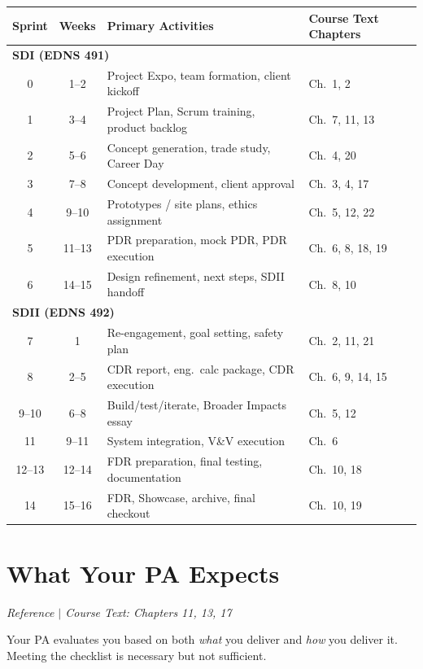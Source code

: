 \documentclass[11pt,letterpaper]{article}
\begin{document}
\begin{center}\small
\begin{longtable}{c c p{5.5cm} p{3.5cm}}
\toprule
\textbf{Sprint} & \textbf{Weeks} & \textbf{Primary Activities} & \textbf{Course Text Chapters} \\
\midrule
\endhead
\multicolumn{4}{l}{\textbf{SDI (EDNS 491)}} \\
\midrule
0 & 1--2 & Project Expo, team formation, client kickoff & Ch.~1, 2 \\
1 & 3--4 & Project Plan, Scrum training, product backlog & Ch.~7, 11, 13 \\
2 & 5--6 & Concept generation, trade study, Career Day & Ch.~4, 20 \\
3 & 7--8 & Concept development, client approval & Ch.~3, 4, 17 \\
4 & 9--10 & Prototypes / site plans, ethics assignment & Ch.~5, 12, 22 \\
5 & 11--13 & PDR preparation, mock PDR, PDR execution & Ch.~6, 8, 18, 19 \\
6 & 14--15 & Design refinement, next steps, SDII handoff & Ch.~8, 10 \\
\midrule
\multicolumn{4}{l}{\textbf{SDII (EDNS 492)}} \\
\midrule
7 & 1 & Re-engagement, goal setting, safety plan & Ch.~2, 11, 21 \\
8 & 2--5 & CDR report, eng.\ calc package, CDR execution & Ch.~6, 9, 14, 15 \\
9--10 & 6--8 & Build/test/iterate, Broader Impacts essay & Ch.~5, 12 \\
11 & 9--11 & System integration, V\&V execution & Ch.~6 \\
12--13 & 12--14 & FDR preparation, final testing, documentation & Ch.~10, 18 \\
14 & 15--16 & FDR, Showcase, archive, final checkout & Ch.~10, 19 \\
\bottomrule
\end{longtable}
\end{center}

\section{What Your PA Expects}
\textit{Reference $|$ Course Text: Chapters 11, 13, 17}

Your PA evaluates you based on both \emph{what} you deliver and \emph{how} you deliver it. Meeting the checklist is necessary but not sufficient.
\end{document}
